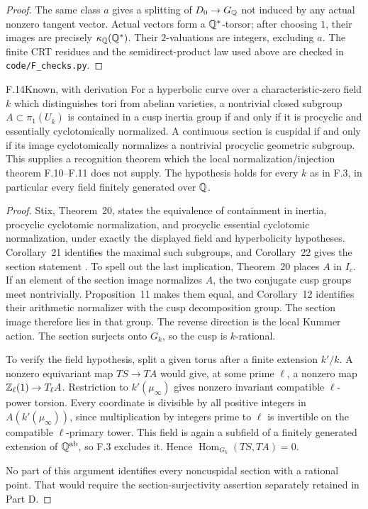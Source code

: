\begin{proof}
The same class $a$ gives a splitting of $D_0\to G_{\mathbb Q}$ not
induced by any actual nonzero tangent vector. Actual vectors form
a $\mathbb Q^*$-torsor; after choosing $1$, their images are precisely
$\kappa_{\mathbb Q}(\mathbb Q^*)$. Their $2$-valuations are integers, excluding
$a$. The finite CRT residues and the semidirect-product law used
above are checked in \texttt{code/F\_checks.py}.
\end{proof}

\begin{claim}{F.14}{Known, with derivation}
For a hyperbolic curve over a characteristic-zero field $k$ which
distinguishes tori from abelian varieties, a nontrivial closed
subgroup $A\subset\pi_1(U_{\bar k})$ is contained in a cusp
inertia group if and only if it is procyclic and essentially
cyclotomically normalized. A continuous section is cuspidal if
and only if its image cyclotomically normalizes a nontrivial
procyclic geometric subgroup. This supplies a recognition theorem
which the local normalization/injection theorem F.10--F.11 does
not supply. The hypothesis holds for every $k$ as in F.3, in
particular every field finitely generated over $\mathbb Q$.
\end{claim}
\begin{proof}
Stix, Theorem~20, states the equivalence of containment in inertia,
procyclic cyclotomic normalization, and procyclic essential
cyclotomic normalization, under exactly the displayed field and
hyperbolicity hypotheses. Corollary~21 identifies the maximal
such subgroups, and Corollary~22 gives the section statement
\citep{F_Stix2008}. To spell out the last implication, Theorem~20
places $A$ in $I_c$. If an element of the section image normalizes
$A$, the two conjugate cusp groups meet nontrivially. Proposition~11
makes them equal, and Corollary~12 identifies their arithmetic
normalizer with the cusp decomposition group. The section image
therefore lies in that group. The reverse direction is the local
Kummer action. The section surjects onto $G_k$, so the cusp is
$k$-rational.

To verify the field hypothesis, split a given torus after a finite
extension $k'/k$. A nonzero equivariant map
$T S\to T A$ would give, at some prime $\ell$, a nonzero map
$\mathbb Z_\ell(1)\to T_\ell A$. Restriction to
$k'(\mu_\infty)$ gives nonzero invariant compatible
$\ell$-power torsion. Every coordinate is divisible by all
positive integers in $A(k'(\mu_\infty))$, since multiplication by
integers prime to $\ell$ is invertible on the compatible
$\ell$-primary tower. This field is again a subfield of a
finitely generated extension of $\mathbb Q^{\mathrm{ab}}$, so F.3
excludes it. Hence $\operatorname{Hom}_{G_k}(T S,T A)=0$.

No part of this argument identifies every noncuspidal section with
a rational point. That would require the section-surjectivity
assertion separately retained in Part D.
\end{proof}

